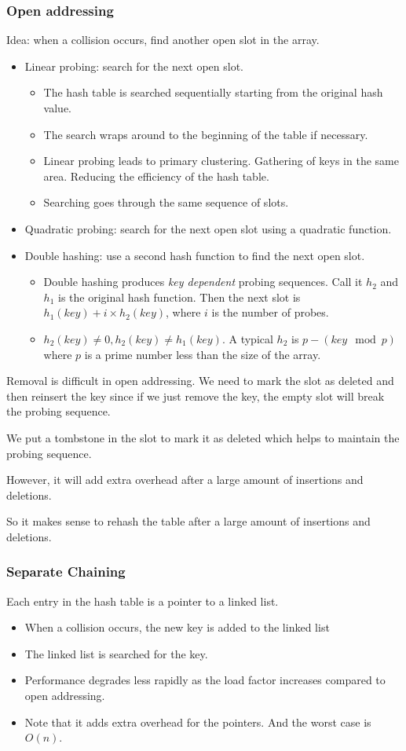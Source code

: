 \documentclass[letterpaper,12pt]{article}
\begin{document}
\subsubsection{Open addressing}
Idea: when a collision occurs, find another open slot in the array. \begin{itemize}
    \item Linear probing: search for the next open slot.\begin{itemize}
        \item The hash table is searched sequentially starting from the original hash value.
        \item The search wraps around to the beginning of the table if necessary.
        \item Linear probing leads to primary clustering. Gathering of keys in the same area. Reducing the efficiency of the hash table.
        \item Searching goes through the same sequence of slots.
    \end{itemize}
    \item Quadratic probing: search for the next open slot using a quadratic function.
    \item Double hashing: use a second hash function to find the next open slot. \begin{itemize}
        \item Double hashing produces \textit{key dependent} probing sequences. Call it $h_2$ and $h_1$ is the original hash function. Then the next slot is $h_1(key) + i \times h_2(key)$, where $i$ is the number of probes.
        \item $h_2(key)\neq 0, h_2(key)\neq h_1(key)$. A typical $h_2$ is $p-(key \mod p)$ where $p$ is a prime number less than the size of the array.
    \end{itemize}
\end{itemize}
Removal is difficult in open addressing. We need to mark the slot as deleted and then reinsert the key since if we just remove the key, the empty slot will break the probing sequence.

We put a tombstone in the slot to mark it as deleted which helps to maintain the probing sequence.

However, it will add extra overhead after a large amount of insertions and deletions.

So it makes sense to rehash the table after a large amount of insertions and deletions.
\subsubsection{Separate Chaining}
Each entry in the hash table is a pointer to a linked list. \begin{itemize}
    \item When a collision occurs, the new key is added to the linked list
    \item The linked list is searched for the key.
    \item Performance degrades less rapidly as the load factor increases compared to open addressing.
    \item Note that it adds extra overhead for the pointers. And the worst case is $O(n)$.
\end{itemize}
\end{document}
